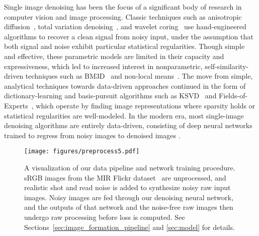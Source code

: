 \documentclass[10pt,twocolumn,letterpaper]{article}
\begin{document}
Single image denoising has been the focus of a significant body of research in computer vision and image processing.
Classic techniques such as anisotropic diffusion~\cite{PeronaMalik1990}, total variation denoising~\cite{Rudin1992}, and wavelet coring~\cite{Simoncelli1996}
use hand-engineered algorithms to recover a clean signal from noisy input, under the assumption that both signal and noise exhibit particular statistical regularities.
Though simple and effective,
these parametric models are limited in their capacity and expressiveness, which led to
increased interest in nonparametric, self-similarity-driven techniques such as BM3D~\cite{BM3D} and non-local means~\cite{NonlocalMeans}.
The move from simple, analytical techniques towards data-driven approaches continued in the form of dictionary-learning and basis-pursuit algorithms such as KSVD~\cite{KSVD} and Fields-of-Experts~\cite{FoE}, which operate by finding image representations where sparsity holds or statistical regularities are well-modeled.
In the modern era, most single-image denoising algorithms are entirely data-driven, consisting of deep neural networks trained to regress from noisy images to denoised images \cite{GharbiDemosaic, CBDnet, NNN, Schmidt2014, TWSC, Zhang2017}.


\begin{figure*}[t!]
\begin{center}
   \texttt{[image: figures/preprocess5.pdf]}
\end{center}
   \caption{A visualization of our data pipeline and network training procedure. sRGB images from the MIR Flickr dataset~\cite{huiskes10mir} are unprocessed, and realistic shot and read noise is added to synthesize noisy raw input images. Noisy images are fed through our denoising neural network, and the outputs of that network and the noise-free raw images then undergo raw processing before  loss is computed. See Sections~\ref{sec:image_formation_pipeline} and \ref{sec:model} for details.}
\label{fig:datapipeline}
\end{figure*}
\end{document}
